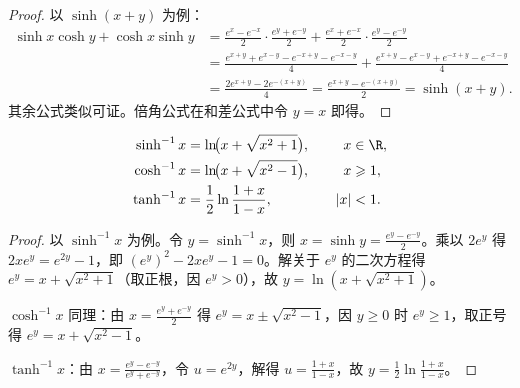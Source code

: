 \begin{proof}
	以 $\sinh(x+y)$ 为例：
	\[
	\begin{aligned}
	\sinh x \cosh y + \cosh x \sinh y
	&= \frac{e^x-e^{-x}}{2} \cdot \frac{e^y+e^{-y}}{2} + \frac{e^x+e^{-x}}{2} \cdot \frac{e^y-e^{-y}}{2} \\
	&= \frac{e^{x+y} + e^{x-y} - e^{-x+y} - e^{-x-y}}{4} + \frac{e^{x+y} - e^{x-y} + e^{-x+y} - e^{-x-y}}{4} \\
	&= \frac{2e^{x+y} - 2e^{-(x+y)}}{4} = \frac{e^{x+y} - e^{-(x+y)}}{2} = \sinh(x+y).
	\end{aligned}
	\]
	其余公式类似可证。倍角公式在和差公式中令 $y = x$ 即得。
\end{proof}

\begin{proposition}[反双曲函数的对数表示]
	\[
	\begin{aligned}
		\sinh^{-1} x &= \ln\!\bigl(x + \sqrt{x^2+1}\bigr), \quad &x &\in \R, \\
		\cosh^{-1} x &= \ln\!\bigl(x + \sqrt{x^2-1}\bigr), \quad &x &\geqslant 1, \\
		\tanh^{-1} x &= \frac{1}{2}\ln\frac{1+x}{1-x}, \quad &|x| &< 1.
	\end{aligned}
	\]
\end{proposition}

\begin{proof}
	以 $\sinh^{-1} x$ 为例。令 $y = \sinh^{-1} x$，则 $x = \sinh y = \frac{e^y - e^{-y}}{2}$。乘以 $2e^y$ 得 $2x e^y = e^{2y} - 1$，即 $(e^y)^2 - 2x e^y - 1 = 0$。解关于 $e^y$ 的二次方程得 $e^y = x + \sqrt{x^2+1}$（取正根，因 $e^y > 0$），故 $y = \ln(x + \sqrt{x^2+1})$。
	
	$\cosh^{-1}x$ 同理：由 $x = \frac{e^y+e^{-y}}{2}$ 得 $e^y = x \pm \sqrt{x^2-1}$，因 $y \geqslant 0$ 时 $e^y \geqslant 1$，取正号得 $e^y = x + \sqrt{x^2-1}$。
	
	$\tanh^{-1} x$：由 $x = \frac{e^y-e^{-y}}{e^y+e^{-y}}$，令 $u = e^{2y}$，解得 $u = \frac{1+x}{1-x}$，故 $y = \frac{1}{2}\ln\frac{1+x}{1-x}$。
\end{proof}


